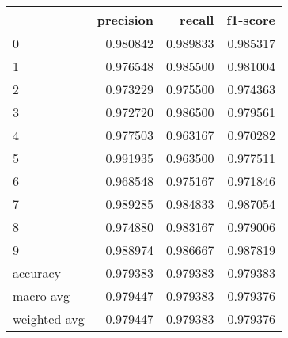 \begin{tabular}{lrrr}
\toprule
 & precision & recall & f1-score \\
\midrule
0 & 0.980842 & 0.989833 & 0.985317 \\
1 & 0.976548 & 0.985500 & 0.981004 \\
2 & 0.973229 & 0.975500 & 0.974363 \\
3 & 0.972720 & 0.986500 & 0.979561 \\
4 & 0.977503 & 0.963167 & 0.970282 \\
5 & 0.991935 & 0.963500 & 0.977511 \\
6 & 0.968548 & 0.975167 & 0.971846 \\
7 & 0.989285 & 0.984833 & 0.987054 \\
8 & 0.974880 & 0.983167 & 0.979006 \\
9 & 0.988974 & 0.986667 & 0.987819 \\
accuracy & 0.979383 & 0.979383 & 0.979383 \\
macro avg & 0.979447 & 0.979383 & 0.979376 \\
weighted avg & 0.979447 & 0.979383 & 0.979376 \\
\bottomrule
\end{tabular}

